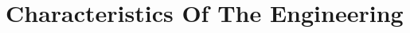 \documentclass[
 size=14pt,
 paper=smartboard,  %
 mode=present, 		%
 display=slides, 	%
 style=tuliplab,  	%
 pauseslide,
 fleqn,leqno]{powerdot}
\begin{document}





\section{Characteristics Of The Engineering} 


\end{document}
